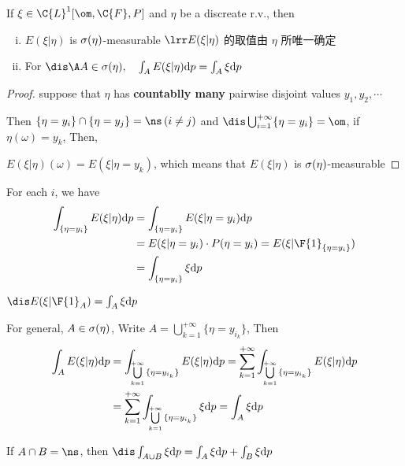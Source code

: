 
If $\xi \in \C{L}^1[\om, \C{F}, P]$ and $\eta$ be a discreate r.v., then
\begin{enumerate}[(i)]
    \item $E(\xi|\eta)$ is $\sigma(\eta)$-measurable $\lrr E(\xi|\eta)$ {\kaishu 的取值由} $\eta$ {\kaishu 所唯一确定} 
    \item For $\dis \A A \in \sg(\eta), \quad \int_{A}^{}{E(\xi|\eta) \mathrm{d}p} = \int_{A}^{}{\xi \mathrm{d}p}$
\end{enumerate}

\begin{proof}
    suppose that $\eta$ has {\bf countablly many}  pairwise disjoint values $y_1, y_2, \cdots$

    Then $\{\eta = y_i\}\cap\{\eta=y_j\} = \ns\,(i\neq j)$ and $\dis \bigcup_{i=1}^{+\infty}\{\eta=y_i\} = \om$, if $\eta(\omega) = y_k$, Then, 

    $E(\xi|\eta)(\omega) = E(\xi|\eta=y_k)$, which means that $E(\xi|\eta)$ is $\sigma(\eta)$-measurable
\end{proof}


For each $i$, we have
\begin{align*}
    \int_{\{\eta=y_i\}}^{}{E(\xi|\eta) \mathrm{d}p} 
    & = \int_{\{\eta=y_i\}}^{}{E(\xi|\eta=y_i) \mathrm{d}p} \\
    & = E(\xi|\eta=y_i)\cdot P(\eta=y_i) = E(\xi|\F{1}_{\{\eta=y_i\}}) \\
    & = \int_{\{\eta=y_i\}}^{}{\xi \mathrm{d}p}
\end{align*}

 $\dis E(\xi|\F{1}_A) = \int_{A}^{}{\xi \mathrm{d}p}$

For general, $A\in \sigma(\eta)$, Write $A = \bigcup_{k=1}^{+\infty}{\{\eta=y_{i_k}\}}$, Then 
\begin{align}
    \int_{A}^{}{E(\xi|\eta) \mathrm{d}p} 
    & = \int_{\bigcup\limits_{k=1}^{+\infty}{\{\eta=y_{i_k}\}}}^{}{E(\xi|\eta) \mathrm{d}p} = \sum_{k=1}^{+\infty}{\int_{\bigcup\limits_{k=1}^{+\infty}{\{\eta=y_{i_k}\}}}^{}{E(\xi|\eta) \mathrm{d}}p}\notag \\
    & = \sum_{k=1}^{+\infty}{\int_{\bigcup\limits_{k=1}^{+\infty}{\{\eta=y_{i_k}\}}}^{}{\xi \mathrm{d}}p} = \int_{A}^{}{\xi \mathrm{d}p}
\end{align}

 If $A\cap B=\ns$, then $\dis \int_{A\cup B}^{}{\xi \mathrm{d}p} = \int_{A}^{}{\xi \mathrm{d}}p + \int_{B}^{}{\xi \mathrm{d}p}$

